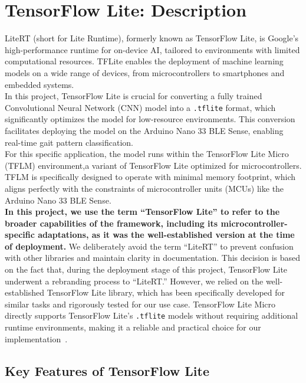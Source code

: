 \newpage


\section{TensorFlow Lite: Description}
LiteRT (short for Lite Runtime), formerly known as TensorFlow Lite\cite{GoogleLiteRT:2023}, is Google's high-performance runtime for on-device AI, tailored to environments with limited computational resources. TFLite enables the deployment of machine learning models on a wide range of devices, from microcontrollers to smartphones and embedded systems. \\

In this project, TensorFlow Lite is crucial for converting a fully trained Convolutional Neural Network (CNN) model into a \texttt{.tflite} format, which significantly optimizes the model for low-resource environments. This conversion facilitates deploying the model on the Arduino Nano 33 BLE Sense, enabling real-time gait pattern classification.\\

For this specific application, the model runs within the TensorFlow Lite Micro (TFLM) environment,a variant of TensorFlow Lite optimized for microcontrollers. TFLM is specifically designed to operate with minimal memory footprint, which aligns perfectly with the constraints of microcontroller units (MCUs) like the Arduino Nano 33 BLE Sense.\\

\textbf{In this project, we use the term ``TensorFlow Lite'' to refer to the broader capabilities of the framework, including its microcontroller-specific adaptations, as it was the well-established version at the time of deployment.} We deliberately avoid the term ``LiteRT'' to prevent confusion with other libraries and maintain clarity in documentation. This decision is based on the fact that, during the deployment stage of this project, TensorFlow Lite underwent a rebranding process to ``LiteRT.'' However, we relied on the well-established TensorFlow Lite library, which has been specifically developed for similar tasks and rigorously tested for our use case. TensorFlow Lite Micro directly supports TensorFlow Lite’s \texttt{.tflite} models without requiring additional runtime environments, making it a reliable and practical choice for our implementation~\cite{GoogleLiteRT:2023}. \\


\subsection{Key Features of TensorFlow Lite}

